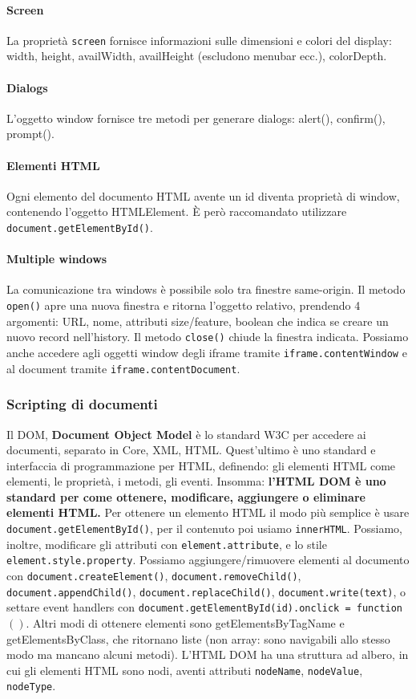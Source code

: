 \documentclass[11pt]{article}
\newcommand{\code}[1]{\texttt{#1}}
\begin{document}
\paragraph{Screen} La proprietà \code{screen} fornisce informazioni sulle dimensioni e colori del display: width, height, availWidth, availHeight (escludono menubar ecc.), colorDepth. 
\paragraph{Dialogs} L'oggetto window fornisce tre metodi per generare dialogs: alert(), confirm(), prompt().
\paragraph{Elementi HTML} Ogni elemento del documento HTML avente un id diventa proprietà di window, contenendo l'oggetto HTMLElement. È però raccomandato utilizzare \code{document.getElementById()}. 
\paragraph{Multiple windows} La comunicazione tra windows è possibile solo tra finestre same-origin. Il metodo \code{open()} apre una nuova finestra e ritorna l'oggetto relativo, prendendo 4 argomenti: URL, nome, attributi size/feature, boolean che indica se creare un nuovo record nell'history. Il metodo \code{close()} chiude la finestra indicata. Possiamo anche accedere agli oggetti window degli iframe tramite \code{iframe.contentWindow} e al document tramite \code{iframe.contentDocument}. 
\subsubsection{Scripting di documenti}
Il DOM, \textbf{Document Object Model} è lo standard W3C per accedere ai documenti, separato in Core, XML, HTML. Quest'ultimo è uno standard e interfaccia di programmazione per HTML, definendo: gli elementi HTML come elementi, le proprietà, i metodi, gli eventi. Insomma: \textbf{l'HTML DOM è uno standard per come ottenere, modificare, aggiungere o eliminare elementi HTML.}
Per ottenere un elemento HTML il modo più semplice è usare \code{document.getElementById()}, per il contenuto poi usiamo \code{innerHTML}. Possiamo, inoltre, modificare gli attributi con \code{element.attribute}, e lo stile \code{element.style.property}. Possiamo aggiungere/rimuovere elementi al documento con \code{document.createElement()}, \code{document.removeChild()}, \code{document.appendChild()}, \code{document.replaceChild()}, \code{document.write(text)}, o settare event handlers con \code{document.getElementById(id).onclick = function $(){}$}. Altri modi di ottenere elementi sono getElementsByTagName e getElementsByClass, che ritornano liste (non array: sono navigabili allo stesso modo ma mancano alcuni metodi). L'HTML DOM ha una struttura ad albero, in cui gli elementi HTML sono nodi, aventi attributi \code{nodeName}, \code{nodeValue}, \code{nodeType}.
\end{document}
